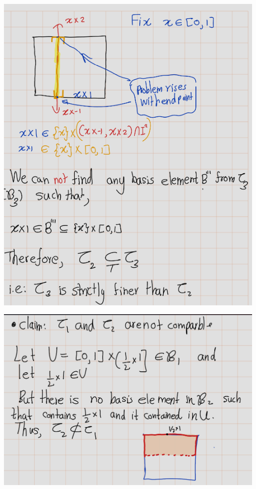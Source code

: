 \documentclass[
]{book}
\theoremstyle{definition}
\theoremstyle{definition}
\theoremstyle{definition}
\theoremstyle{definition}
\theoremstyle{remark}
\begin{document}
\begin{center}\includegraphics{figures/Exercises/Ex 2.16/ex-10-6} \end{center}

\begin{center}\includegraphics{figures/Exercises/Ex 2.16/ex-10-7} \end{center}
\end{document}

